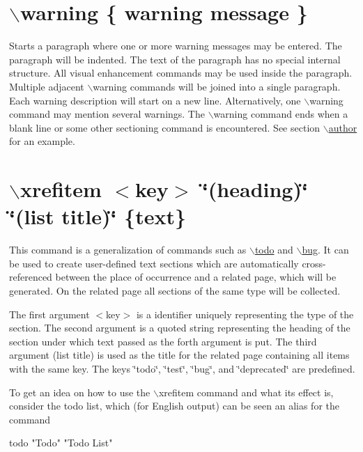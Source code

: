  \hypertarget{commands_cmdwarning}{}\section{$\backslash$warning \{ warning message \}}\label{commands_cmdwarning}
 Starts a paragraph where one or more warning messages may be entered. The paragraph will be indented. The text of the paragraph has no special internal structure. All visual enhancement commands may be used inside the paragraph. Multiple adjacent $\backslash$warning commands will be joined into a single paragraph. Each warning description will start on a new line. Alternatively, one $\backslash$warning command may mention several warnings. The $\backslash$warning command ends when a blank line or some other sectioning command is encountered. See section \hyperlink{commands_cmdauthor}{$\backslash$author} for an example.\hypertarget{commands_cmdxrefitem}{}\section{$\backslash$xrefitem $<$key$>$ \char`\"{}(heading)\char`\"{} \char`\"{}(list title)\char`\"{} \{text\}}\label{commands_cmdxrefitem}
 This command is a generalization of commands such as \hyperlink{commands_cmdtodo}{$\backslash$todo} and \hyperlink{commands_cmdbug}{$\backslash$bug}. It can be used to create user-\/defined text sections which are automatically cross-\/referenced between the place of occurrence and a related page, which will be generated. On the related page all sections of the same type will be collected.

The first argument $<$key$>$ is a identifier uniquely representing the type of the section. The second argument is a quoted string representing the heading of the section under which text passed as the forth argument is put. The third argument (list title) is used as the title for the related page containing all items with the same key. The keys \char`\"{}todo\char`\"{}, \char`\"{}test\char`\"{}, \char`\"{}bug\char`\"{}, and \char`\"{}deprecated\char`\"{} are predefined.

To get an idea on how to use the $\backslash$xrefitem command and what its effect is, consider the todo list, which (for English output) can be seen an alias for the command \begin{DoxyVerb}\xrefitem todo "Todo" "Todo List" \end{DoxyVerb}


